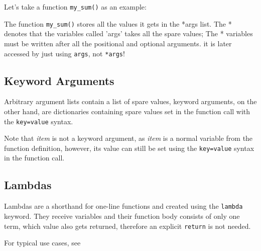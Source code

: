         Let's take a function \texttt{my_sum()} as an example:


        The function \texttt{my_sum()} stores all the values it gets in the *args list.
        The * denotes that the variables called 'args' takes all the spare values; The * variables must
        be written after all the positional and optional arguments.
        it is later accessed by just using \texttt{args}, not \texttt{*args}!

    \subsection{Keyword Arguments}
        Arbitrary argument lists contain a list of spare values, keyword arguments, on the other hand,
        are dictionaries containing spare values set in the function call with the
        \texttt{key=value} syntax.


        Note that \textit{item} is not a keyword argument, as \textit{item} is a normal variable
        from the function definition, however, its value can still be set using the
        \texttt{key=value} syntax in the function call.



    \subsection{Lambdas}
        Lambdas are a shorthand for one-line functions and created using the
        \texttt{lambda} keyword. They receive variables and their function body consists
        of only one term, which value also gets returned, therefore an explicit
        \texttt{return} is not needed.

        For typical use cases, see 

